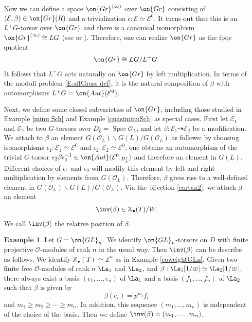 \documentclass[11pt]{amsart}
\theoremstyle{definition}
\theoremstyle{definition}
\newtheorem{ex}[thm]{Example}
\theoremstyle{definition}
\numberwithin{equation}{subsection}
\newcommand{\bZ}{{\mathbb Z}}
\newcommand{\mE}{{\mathcal E}}
\newcommand{\mO}{{\mathcal O}}
\newcommand{\Aut}{{\on{Aut}}}
\newcommand{\Gr}{{\on{Gr}}}
\DeclareMathOperator{\Spec}{Spec}
\newcommand{\GL}{{\on{GL}}}
\def\xcoch{\mathbb{X}_\bullet}
\begin{document}
Now we can define a space $\Gr^{(\infty)}$ over $\Gr$ consisting of $(\mE,\beta)\in \Gr(R)$ and a trivialization $\epsilon:\mE\simeq \mE^0$. It turns out that this is an $L^+G$-torsor over $\Gr$ and there is a canonical isomorphism $\Gr^{(\infty)}\cong LG$ (see \cite[Lemma 1.3]{Zh1} or \cite[Proposition 1.3.6]{Zh2}). Therefore, one can realize $\Gr$ as the fpqc quotient
\begin{equation}
\label{E:gr as quotient}
\Gr\cong LG/L^+G.
\end{equation}
It follows that $L^+G$ acts naturally on $\Gr$ by left multiplication. In terms of the moduli problem \eqref{E:affGrass def}, it is the natural composition of $\beta$ with automorphisms $L^+G=\Aut(\mE^0)$.
\medskip

 
Next, we define some closed subvarieties of $\Gr$, including those studied in Example \ref{minu Sch} and Example \ref{quasiminuSch} as special cases.
First let $\mE_1$ and $\mE_2$ be two $G$-torsors over $D_{\bar k}=\Spec \mO_L$, and let $\beta: \mE_1\dashrightarrow\mE_2$ be a modification.
We attach to $\beta$ an element
$G(\mO_L)\backslash G(L)/G(\mO_L)$ as follows: by choosing isomorphisms $\epsilon_1:\mE_1\simeq \mE^0$ and $\epsilon_2:\mE_2\simeq \mE^0$, one obtains an automorphism of the trivial $G$-torsor $\epsilon_2\beta\epsilon_1^{-1}\in \Aut(\mE^0|_{D_{\bar k}^*})$ and therefore an element in $G(L)$. Different choices of $\epsilon_1$ and $\epsilon_2$ will modify this element by left and right multiplication by elements from $G(\mO_L)$. Therefore,
$\beta$ gives rise to a well-defined element in $G(\mO_L)\backslash G(L)/G(\mO_L)$. Via the bijection \eqref{cartan2}, we attach $\beta$ an element
\[\inv(\beta)\in \xcoch(T)/W.\]
We call $\inv(\beta)$ the relative position of $\beta$. 
\begin{ex}\label{invbetaGLn}
Let $G=\GL_n$. We identify $\GL_n$-torsors on $D$ with finite projective $\mO$-modules of rank $n$ in the usual way. Then $\inv(\beta)$ can be describe as follows.
We identify $\xcoch(T)\simeq \bZ^n$ as in Example \ref{coweightGLn}. 
Given two finite free $\mO$-modules of rank $n$ $\La_1$ and $\La_2$, and $\beta: \La_1[1/\varpi]\simeq \La_2[1/\varpi]$, there always exist a basis $(e_1,\ldots,e_n)$ of $\La_1$ and a basis $(f_1,\ldots,f_n)$ of $\La_2$ such that $\beta$ is given by 
$$\beta(e_i)=p^{m_i}f_i$$ 
and $m_1\geq m_2\geq\cdots\geq m_n$. In addition, this sequence $(m_1,\ldots,m_n)$ is independent of the choice of the basis. Then we define $\inv(\beta)=(m_1,\ldots,m_n)$.
\end{ex}
\end{document}
